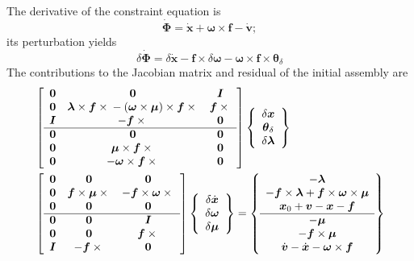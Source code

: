 \documentclass[10pt,dvips,fleqn,subeqn]{report}
\newcommand{\T}[1]{\boldsymbol{#1}}
\begin{document}
The derivative of the constraint equation is
\begin{equation}
	\dot{\T{\Phi}}
	= \dot{\T{x}}
	+ \T{\omega}\times\T{f}
	- \dot{\T{v}} ;
\end{equation}
its perturbation yields
\begin{equation}
	\delta\dot{\T{\Phi}}
	= \delta\dot{\T{x}}
	- \T{f}\times\delta\T{\omega}
	- \T{\omega}\times\T{f}\times\T{\theta}_{\delta}
\end{equation}
The contributions to the Jacobian matrix and residual 
of the initial assembly are
\begin{align}
	& \sqbr{\matr{ccc}{
		\T{0} & \T{0} & \T{I} \\				%
		\T{0} & \T{\lambda}\times\T{f}\times{}
			- \plbr{\T{\omega}\times\T{\mu}}\times\T{f}\times{} &
			\T{f}\times{} \\				%
		\T{I} & -\T{f}\times{} & \T{0} \\			%
%
	\hline
		\T{0} & \T{0} & \T{0} \\				%
		\T{0} & \T{\mu}\times\T{f}\times{} & \T{0} \\		%
		\T{0} & -\T{\omega}\times\T{f}\times{} & \T{0}		%
	}} \cubr{\cvvect{
		\delta\T{x} \\
		\T{\theta}_{\delta} \\
		\delta\T{\lambda}
	}} \nonumber \\
	& \sqbr{\matr{ccc}{
		\T{0} & \T{0} & \T{0} \\				%
		\T{0} & \T{f}\times\T{\mu}\times{} &
			-\T{f}\times\T{\omega}\times{} \\		%
		\T{0} & \T{0} & \T{0} \\				%
%
	\hline
		\T{0} & \T{0} & \T{I} \\				%
		\T{0} & \T{0} & \T{f}\times{} \\			%
		\T{I} & -\T{f}\times{} & \T{0} 				%
	}} \cubr{\cvvect{
		\delta\dot{\T{x}} \\
		\delta\T{\omega} \\
		\delta\T{\mu}
	}} %
	= \cubr{\cvvect{
		- \T{\lambda} \\
		- \T{f}\times\T{\lambda}
			+ \T{f}\times\T{\omega}\times\T{\mu} \\
		\T{x}_0 + \T{v} - \T{x} - \T{f} \\
%
	\hline
		- \T{\mu} \\
		- \T{f}\times\T{\mu} \\
		\dot{\T{v}} - \dot{\T{x}} - \T{\omega}\times\T{f}
	}}
\end{align}
\end{document}
